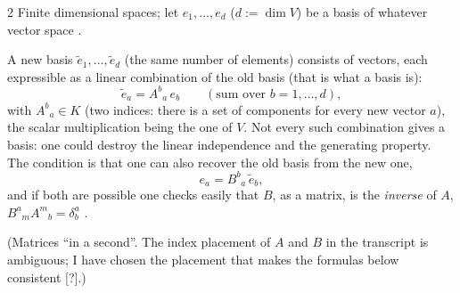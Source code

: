 \begin{paracol}{2}
Finite dimensional spaces; let $e_1,\dots,e_d$ ($d:=\dim V$) be a basis of whatever vector space .
\begin{definition}\label{def:te-change}
A new basis $\tilde e_1,\dots,\tilde e_d$ (the same number of elements) consists of vectors, each expressible as a linear combination of the old basis (that is what a basis is):
\[
  \tilde e_a=A^b{}_a\,e_b\qquad(\text{sum over }b=1,\dots,d),
\]
with $A^b{}_a\in K$ (two indices: there is a set of components for every new vector $a$), the scalar multiplication being the one of $V$. Not every such combination gives a basis: one could destroy the linear independence and the generating property. The condition is that one can also recover the old basis from the new one,
\[
  e_a=B^b{}_a\,\tilde e_b,
\]
and if both are possible one checks easily that $B$, as a matrix, is the \emph{inverse} of $A$, $B^a{}_mA^m{}_b=\delta^a_b$
.
\end{definition}
(Matrices ``in a second''. The index placement of $A$ and $B$ in the transcript is ambiguous; I have chosen the placement that makes the formulas below consistent [?].)


\end{paracol}
